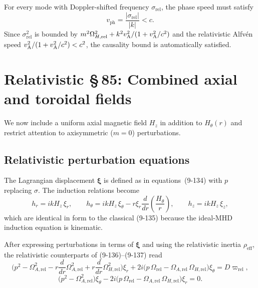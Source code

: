 \begin{causalitycheck}
For every mode with Doppler-shifted frequency $\sigma_{\mathrm{rel}}$,
the phase speed must satisfy
\begin{equation}
  v_{\mathrm{ph}}
  = \frac{|\sigma_{\mathrm{rel}}|}{|k|}
  < c.
  \label{eq:rel9-causality-84}
\end{equation}
Since $\sigma_{\mathrm{rel}}^{2}$ is bounded by
$m^{2}\Omega_{H,\mathrm{rel}}^{2} + k^{2}v_{\mathrm{A}}^{2}/(1+v_{\mathrm{A}}^{2}/c^{2})$
and the relativistic Alfv\'en speed
$v_{\mathrm{A}}^{2}/(1+v_{\mathrm{A}}^{2}/c^{2}) < c^{2}$, the causality bound is
automatically satisfied.
\end{causalitycheck}

\section{Relativistic \S\,85: Combined axial and toroidal fields}
\label{sec:rel9-85}

We now include a uniform axial magnetic field $H_z$ in addition to
$H_\theta(r)$ and restrict attention to axisymmetric ($m = 0$)
perturbations.

\subsection{Relativistic perturbation equations}

The Lagrangian displacement $\boldsymbol{\xi}$ is defined as in
equations~(9-134) with $p$ replacing $\sigma$.  The induction
relations become
\begin{equation}
  h_r = ikH_z\,\xi_r,
  \qquad
  h_\theta = ikH_z\,\xi_\theta
    - r\xi_r\frac{d}{dr}\!\left(\frac{H_\theta}{r}\right),
  \qquad
  h_z = ikH_z\,\xi_z,
  \label{eq:rel9-135-rel}
\end{equation}
which are identical in form to the classical (9-135) because the
ideal-MHD induction equation is kinematic.

After expressing perturbations in terms of $\boldsymbol{\xi}$
and using the relativistic inertia $\rho_{\mathrm{eff}}$,
the relativistic counterparts of (9-136)--(9-137) read
\begin{equation}
  \bigl(p^{2} - \Omega_{A,\mathrm{rel}}^{2}
    - r\frac{d}{dr}\Omega_{A,\mathrm{rel}}^{2}
    + r\frac{d}{dr}\Omega_{H,\mathrm{rel}}^{2}\bigr)\xi_r
  + 2i\bigl(p\,\Omega_{\mathrm{rel}}
    - \Omega_{A,\mathrm{rel}}\,\Omega_{H,\mathrm{rel}}\bigr)\xi_\theta
  = D\varpi_{\mathrm{rel}},
  \label{eq:rel9-136-rel}
\end{equation}
\begin{equation}
  \bigl(p^{2} - \Omega_{A,\mathrm{rel}}^{2}\bigr)\xi_\theta
  - 2i\bigl(p\,\Omega_{\mathrm{rel}}
    - \Omega_{A,\mathrm{rel}}\,\Omega_{H,\mathrm{rel}}\bigr)\xi_r
  = 0.
  \label{eq:rel9-137-rel}
\end{equation}

